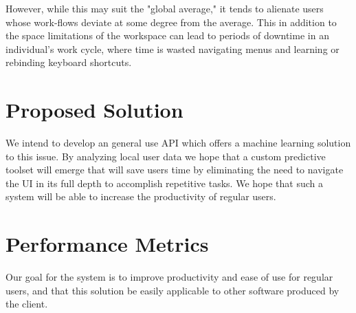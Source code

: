 \documentclass[onecolumn, draftclsnofoot,10pt, compsoc]{IEEEtran}
\begin{document}
However, while this may suit the "global average," it tends to alienate users whose work-flows deviate at some degree from the average.  This in addition to the space limitations of the workspace can lead to periods of downtime in an individual's work cycle, where time is wasted navigating menus and learning or rebinding keyboard shortcuts. 

\section{Proposed Solution}

We intend to develop an general use API which offers a machine learning solution to this issue. By analyzing local user data we hope that a custom predictive toolset will emerge that will save users time by eliminating the need to navigate the UI in its full depth to accomplish repetitive tasks.  We hope that such a system will be able to increase the productivity of regular users.  

\section{Performance Metrics}

Our goal for the system is to improve productivity and ease of use for regular users, and that this solution be easily applicable to other software produced by the client.

\nocite{*}
%
%
\end{document}
